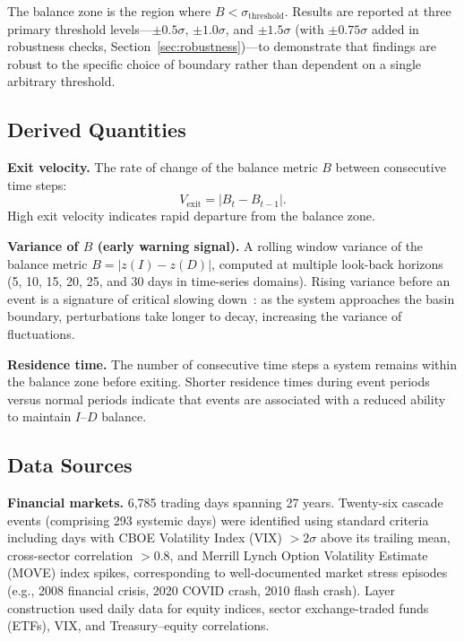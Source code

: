 \documentclass[aip,cha,reprint,amsmath,amssymb]{revtex4-2}
\begin{document}
The balance zone is the region where $B < \sigma_{\text{threshold}}$. Results are reported at three primary threshold levels---$\pm 0.5\sigma$, $\pm 1.0\sigma$, and $\pm 1.5\sigma$ (with $\pm 0.75\sigma$ added in robustness checks, Section~\ref{sec:robustness})---to demonstrate that findings are robust to the specific choice of boundary rather than dependent on a single arbitrary threshold.

\subsection{Derived Quantities}

\textbf{Exit velocity.} The rate of change of the balance metric $B$ between consecutive time steps:
\begin{equation}
V_{\text{exit}} = |B_t - B_{t-1}|.
\end{equation}
High exit velocity indicates rapid departure from the balance zone.

\textbf{Variance of $B$ (early warning signal).} A rolling window variance of the balance metric $B = |z(I) - z(D)|$, computed at multiple look-back horizons (5, 10, 15, 20, 25, and 30 days in time-series domains). Rising variance before an event is a signature of critical slowing down~\cite{scheffer2009,dakos2012}: as the system approaches the basin boundary, perturbations take longer to decay, increasing the variance of fluctuations.

\textbf{Residence time.} The number of consecutive time steps a system remains within the balance zone before exiting. Shorter residence times during event periods versus normal periods indicate that events are associated with a reduced ability to maintain $I$--$D$ balance.

\subsection{Data Sources}

\textbf{Financial markets.} 6,785 trading days spanning 27 years. Twenty-six cascade events (comprising 293 systemic days) were identified using standard criteria including days with CBOE Volatility Index (VIX) $> 2\sigma$ above its trailing mean, cross-sector correlation $> 0.8$, and Merrill Lynch Option Volatility Estimate (MOVE) index spikes, corresponding to well-documented market stress episodes (e.g., 2008 financial crisis, 2020 COVID crash, 2010 flash crash). Layer construction used daily data for equity indices, sector exchange-traded funds (ETFs), VIX, and Treasury--equity correlations.
\end{document}
